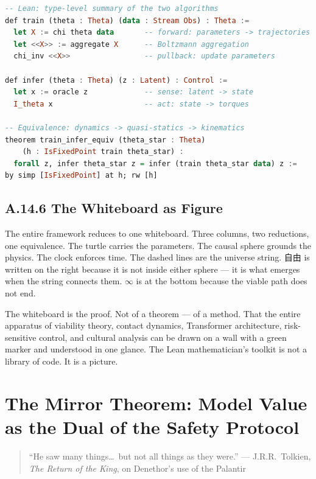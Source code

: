 \documentclass[11pt,a4paper]{article}
\theoremstyle{definition}
\theoremstyle{remark}
\begin{document}
\begin{lstlisting}[language=Haskell,caption={Lean type-level specification and equivalence proof}]
-- Lean: type-level summary of the two algorithms
def train (theta : Theta) (data : Stream Obs) : Theta :=
  let X := chi theta data       -- forward: parameters -> trajectories
  let <<X>> := aggregate X      -- Boltzmann aggregation
  chi_inv <<X>>                 -- pullback: update parameters

def infer (theta : Theta) (z : Latent) : Control :=
  let x := oracle z             -- sense: latent -> state
  I_theta x                     -- act: state -> torques

-- Equivalence: dynamics -> quasi-statics -> kinematics
theorem train_infer_equiv (theta_star : Theta)
    (h : IsFixedPoint train theta_star) :
  forall z, infer theta_star z = infer (train theta_star data) z :=
by simp [IsFixedPoint] at h; rw [h]
\end{lstlisting}


\subsection{A.14.6 The Whiteboard as Figure}

The entire framework reduces to one whiteboard. Three columns, two reductions, one equivalence. The turtle carries the parameters. The causal sphere grounds the physics. The clock enforces time. The dashed lines are the universe string. 自由 is written on the right because it is not inside either sphere --- it is what emerges when the string connects them. $\infty$ is at the bottom because the viable path does not end.

The whiteboard is the proof. Not of a theorem --- of a method. That the entire apparatus of viability theory, contact dynamics, Transformer architecture, risk-sensitive control, and cultural analysis can be drawn on a wall with a green marker and understood in one glance. The Lean mathematician's toolkit is not a library of code. It is a picture.


\section{The Mirror Theorem: Model Value as the Dual of the Safety Protocol}

\begin{quote}
``He saw many things\ldots\ but not all things as they were.'' --- J.R.R.\ Tolkien, \emph{The Return of the King}, on Denethor's use of the Palantir
\end{quote}
\end{document}

